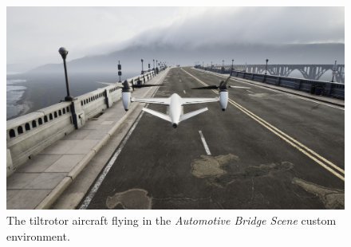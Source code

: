 \begin{figure}[h]
    \centering
    \includegraphics[width=\textwidth]{figures/ue4_bridge_flying}
    \caption[Tiltrotor flying in custom environment]{
        The tiltrotor aircraft flying in the \textit{Automotive Bridge Scene} custom environment.}%
    \label{fig:ue4_bridge_flying}
\end{figure}
